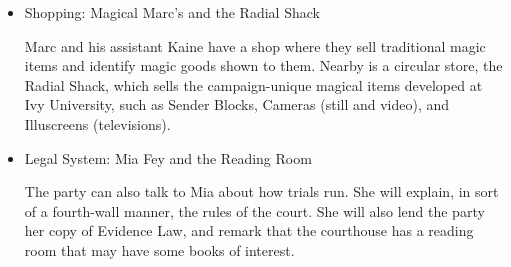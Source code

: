 \begin{itemize}
\item Shopping: Magical Marc's and the Radial Shack

Marc and his assistant Kaine have a shop where they sell traditional magic items and identify magic goods shown to them. Nearby is a circular store, the Radial Shack, which sells the campaign-unique magical items developed at Ivy University, such as Sender Blocks, Cameras (still and video), and Illuscreens (televisions).

\item Legal System: Mia Fey and the Reading Room

The party can also talk to Mia about how trials run. She will explain, in sort of a fourth-wall manner, the rules of the court. She will also lend the party her copy of Evidence Law, and remark that the courthouse has a reading room that may have some books of interest.
\end{itemize}

